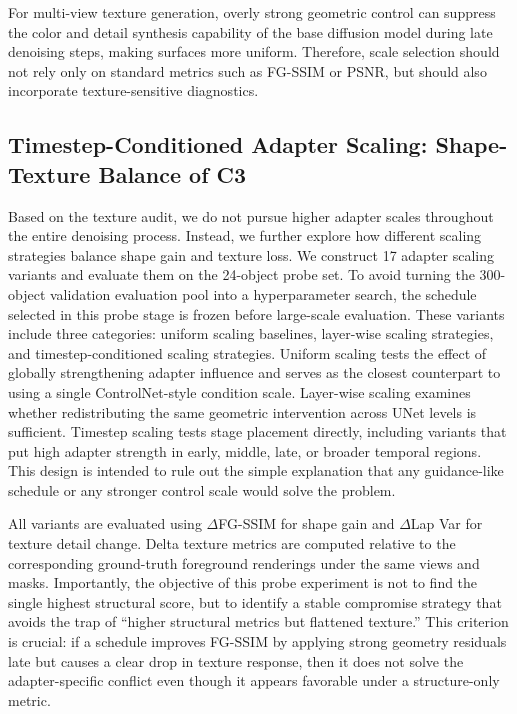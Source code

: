 \documentclass[times,twocolumn,final]{elsarticle}
\providecommand{\DIFadd}[1]{{\protect\color{blue} \sf #1}} %
\providecommand{\DIFdel}[1]{{\protect\color{red} \scriptsize #1}} %
\providecommand{\DIFaddbegin}{} %
\providecommand{\DIFaddend}{} %
\providecommand{\DIFdelbegin}{} %
\providecommand{\DIFdelend}{} %
\newcommand{\DIFscaledelfig}{0.5}
\newlength{\DIFdelgraphicswidth} %
\newlength{\DIFdelgraphicsheight} %
\newcommand{\DIFaddincludegraphics}[2][]{{\color{blue}\fbox{\DIFOincludegraphics[#1]{#2}}}} %
\newcommand{\DIFdelincludegraphics}[2][]{%
\sbox{\DIFdelgraphicsbox}{\DIFOincludegraphics[#1]{#2}}%
\settoboxwidth{\DIFdelgraphicswidth}{\DIFdelgraphicsbox} %
\settoboxtotalheight{\DIFdelgraphicsheight}{\DIFdelgraphicsbox} %
\scalebox{\DIFscaledelfig}{%
\parbox[b]{\DIFdelgraphicswidth}{\usebox{\DIFdelgraphicsbox}\\[-\baselineskip] \rule{\DIFdelgraphicswidth}{0em}}\llap{\resizebox{\DIFdelgraphicswidth}{\DIFdelgraphicsheight}{%
\setlength{\unitlength}{\DIFdelgraphicswidth}%
\begin{picture}(1,1)%
\thicklines\linethickness{2pt} %
{\color[rgb]{1,0,0}\put(0,0){\framebox(1,1){}}}%
{\color[rgb]{1,0,0}\put(0,0){\line( 1,1){1}}}%
{\color[rgb]{1,0,0}\put(0,1){\line(1,-1){1}}}%
\end{picture}%
}\hspace*{3pt}}} %
} %
\DeclareRobustCommand{\DIFaddbegin}{\DIFOaddbegin \let\includegraphics\DIFaddincludegraphics} %
\DeclareRobustCommand{\DIFaddend}{\DIFOaddend \let\includegraphics\DIFOincludegraphics} %
\DeclareRobustCommand{\DIFdelbegin}{\DIFOdelbegin \let\includegraphics\DIFdelincludegraphics} %
\DeclareRobustCommand{\DIFdelend}{\DIFOaddend \let\includegraphics\DIFOincludegraphics} %
\begin{document}
For multi-view texture generation, overly strong geometric control can suppress the color and detail synthesis capability of the base diffusion model during late denoising steps, making surfaces more uniform. Therefore, scale selection should not rely only on standard metrics such as FG-SSIM or PSNR, but should also incorporate texture-sensitive diagnostics.

\subsection{Timestep-Conditioned Adapter Scaling: Shape-Texture Balance of C3}
\label{subsec:c3}

Based on the texture audit, we do not pursue higher adapter scales throughout the entire denoising process. Instead, we further explore how different scaling strategies balance shape gain and texture loss. We construct 17 adapter scaling variants and evaluate them on the 24-object probe set. To avoid turning the 300-object \DIFdelbegin \DIFdel{validation }\DIFdelend \DIFaddbegin \DIFadd{evaluation pool }\DIFaddend into a hyperparameter search, the schedule selected in this probe stage is frozen before large-scale evaluation. These variants include three categories: uniform scaling baselines, layer-wise scaling strategies, and timestep-conditioned scaling strategies. Uniform scaling tests the effect of globally strengthening adapter influence and serves as the closest counterpart to using a single ControlNet-style condition scale. Layer-wise scaling examines whether redistributing the same geometric intervention across UNet levels is sufficient. Timestep scaling tests stage placement directly, including variants that put high adapter strength in early, middle, late, or broader temporal regions. This design is intended to rule out the simple explanation that any guidance-like schedule or any stronger control scale would solve the problem.

All variants are evaluated using $\Delta$FG-SSIM for shape gain and $\Delta$Lap Var for texture detail change. Delta texture metrics are computed relative to the corresponding ground-truth foreground renderings under the same views and masks. Importantly, the objective of this probe experiment is not to find the single highest structural score, but to identify a stable compromise strategy that avoids the trap of ``higher structural metrics but flattened texture.'' This criterion is crucial: if a schedule improves FG-SSIM by applying strong geometry residuals late but causes a clear drop in texture response, then it does not solve the adapter-specific conflict even though it appears favorable under a structure-only metric.
\end{document}
